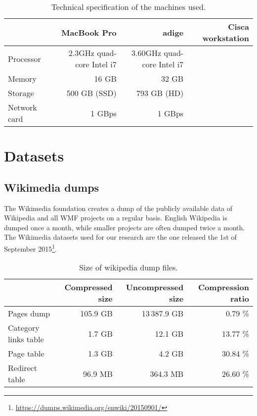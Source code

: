 \begin{table}[]
\centering
\caption{Technical specification of the machines used.}
\label{tbl:tech_specs}
\begin{tabular}{@{}lrrr@{}}
\toprule
\multicolumn{1}{c}{\textbf{}} & \textbf{MacBook Pro}           & \textbf{adige}                  & \textbf{Cisca workstation} \\ \midrule
Processor                     & 2.3GHz quad-core Intel i7 & 3.60GHz quad-core Intel i7 &                            \\
Memory                        & 16 GB                          & 32 GB                           &                            \\
Storage                       & 500 GB (SSD)                   & 793 GB (HD)                     &                            \\
Network card                  & 1 GBps                         & 1 GBps                          &                            \\ \bottomrule
\end{tabular}
\end{table}


\section{Datasets}
\label{sec:datasets}

\subsection{Wikimedia dumps}
The Wikimedia foundation creates a dump of the publicly available data of Wikipedia and all WMF projects on a regular basis.
English Wikipedia is dumped once a month, while smaller projects are often dumped twice a month.
The Wikimedia datasets used for our research are the one released the 1st of September 2015\footnote{\url{https://dumps.wikimedia.org/enwiki/20150901/}}.

\begin{table}[]
\centering
\caption{Size of wikipedia dump files.}
\label{tbl:wikidumps_size}
\begin{tabular}{@{}lrrr@{}}
\multicolumn{1}{c}{\textbf{}} & \textbf{Compressed size} & \textbf{Uncompressed size} & \textbf{Compression ratio} \\ \midrule
Pages dump              &     105.9 GB &   13\,387.9 GB &  0.79 \% \\
Category links table    &       1.7 GB &        12.1 GB & 13.77 \% \\
Page table              &       1.3 GB &         4.2 GB & 30.84 \% \\
Redirect table          &      96.9 MB &       364.3 MB & 26.60 \%
\end{tabular}
\end{table}

